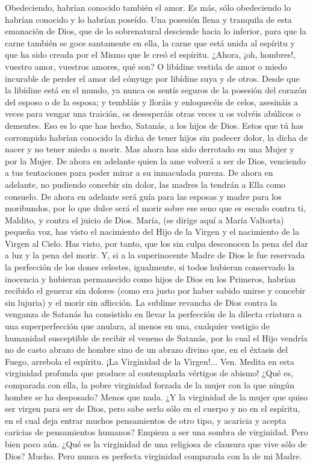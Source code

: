 \documentclass[12pt]{book} %
\begin{document}
Obedeciendo, habrían conocido también el amor. Es más, sólo obedeciendo lo habrían conocido y lo habrían poseído. Una posesión llena y tranquila de esta emanación de Dios, que de lo sobrenatural desciende hacia lo inferior, para que la carne también se goce santamente en ella, la carne que está unida al espíritu y que ha sido creada por el Mismo que le creó el espíritu. 
¿Ahora, ¡oh, hombres!, vuestro amor, vuestros amores, qué son? O libídine vestida de amor o miedo incurable de 
perder el amor del cónyuge por libídine suya y de otros. Desde que la libídine está en el mundo, ya nunca os sentís seguros de la posesión del corazón del esposo o de la esposa; y tembláis y lloráis y enloquecéis de celos, asesináis a veces para vengar una traición, os desesperáis otras veces u os volvéis abúlicos o dementes. 
Eso es lo que has hecho, Satanás, a los hijos de Dios. Estos que tú has corrompido habrían conocido la dicha de tener 
hijos sin padecer dolor, la dicha de nacer y no tener miedo a morir. Mas ahora has sido derrotado en una Mujer y por la Mujer. De ahora en adelante quien la ame volverá a ser de Dios, venciendo a tus tentaciones para poder mirar a su inmaculada pureza. De ahora en adelante, no pudiendo concebir sin dolor, las madres la tendrán a Ella como consuelo. De ahora en adelante será guía para las esposas y madre para los moribundos, por lo que dulce será el morir sobre ese seno que es escudo contra ti, Maldito, y contra el juicio de Dios. 
María, (se dirige aquí a María Valtorta) pequeña voz, has visto el nacimiento del Hijo de la Virgen y el nacimiento de la Virgen al Cielo. Has visto, por tanto, que los sin culpa desconocen la pena del dar a luz y la pena del morir. Y, si a la superinocente Madre de Dios le fue reservada la perfección de los dones celestes, igualmente, si todos hubieran conservado la inocencia y hubieran permanecido como hijos de Dios en los Primeros, habrían recibido el generar sin dolores (como era justo por haber sabido unirse y concebir sin lujuria) y el morir sin aflicción. 
La sublime revancha de Dios contra la venganza de Satanás ha consistido en llevar la perfección de la dilecta criatura a 
una superperfección que anulara, al menos en una, cualquier vestigio de humanidad susceptible de recibir el veneno de Satanás, por lo cual el Hijo vendría no de casto abrazo de hombre sino de un abrazo divino que, en el éxtasis del Fuego, arrebola el espíritu. 
¡La Virginidad de la Virgen!... 
Ven. Medita en esta virginidad profunda que produce al contemplarla vértigos de abismo! ¿Qué es, comparada con ella, la pobre virginidad forzada de la mujer con la que ningún hombre se ha desposado? Menos que nada. ¿Y la virginidad de la mujer que quiso ser virgen para ser de Dios, pero sabe serlo sólo en el cuerpo y no en el espíritu, en el cual deja entrar muchos pensamientos de otro tipo, y acaricia y acepta caricias de pensamientos humanos? Empieza a ser una sombra de virginidad. Pero bien poco aún. ¿Qué es la virginidad de una religiosa de clausura que vive sólo de Dios? Mucho. Pero nunca es perfecta virginidad comparada con la de mi Madre. 
\end{document}
